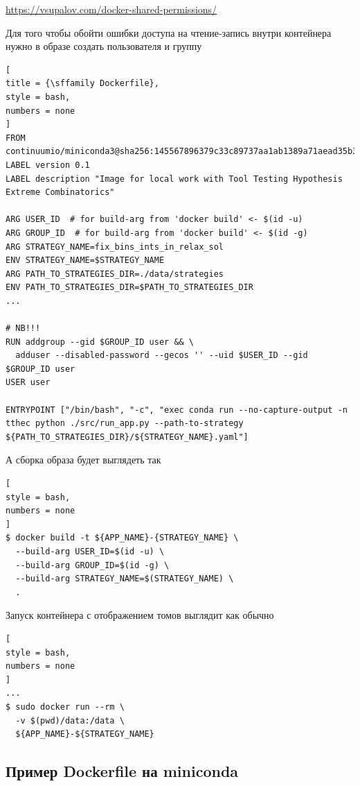\documentclass[%
	11pt,
	a4paper,
	utf8,
		]{article}
\begin{document}
\url{https://vsupalov.com/docker-shared-permissions/}

Для того чтобы обойти ошибки доступа на чтение-запись внутри контейнера нужно в образе создать пользователя и группу
\begin{lstlisting}[
title = {\sffamily Dockerfile},
style = bash,
numbers = none
]
FROM continuumio/miniconda3@sha256:145567896379c33c89737aa1ab1389a71aead35b39f512118a13edcf9fe2a42c
LABEL version 0.1
LABEL description "Image for local work with Tool Testing Hypothesis Extreme Combinatorics"

ARG USER_ID  # for build-arg from 'docker build' <- $(id -u)
ARG GROUP_ID  # for build-arg from 'docker build' <- $(id -g)
ARG STRATEGY_NAME=fix_bins_ints_in_relax_sol
ENV STRATEGY_NAME=$STRATEGY_NAME
ARG PATH_TO_STRATEGIES_DIR=./data/strategies
ENV PATH_TO_STRATEGIES_DIR=$PATH_TO_STRATEGIES_DIR
...

# NB!!!
RUN addgroup --gid $GROUP_ID user && \
  adduser --disabled-password --gecos '' --uid $USER_ID --gid $GROUP_ID user
USER user

ENTRYPOINT ["/bin/bash", "-c", "exec conda run --no-capture-output -n tthec python ./src/run_app.py --path-to-strategy ${PATH_TO_STRATEGIES_DIR}/${STRATEGY_NAME}.yaml"]
\end{lstlisting}

А сборка образа будет выглядеть так
\begin{lstlisting}[
style = bash,
numbers = none	
]
$ docker build -t ${APP_NAME}-{STRATEGY_NAME} \
  --build-arg USER_ID=$(id -u) \
  --build-arg GROUP_ID=$(id -g) \
  --build-arg STRATEGY_NAME=$(STRATEGY_NAME) \
  .
\end{lstlisting}

Запуск контейнера с отображением томов выглядит как обычно
\begin{lstlisting}[
style = bash,
numbers = none
]
...
$ sudo docker run --rm \
  -v $(pwd)/data:/data \
  ${APP_NAME}-${STRATEGY_NAME}
\end{lstlisting}

\subsection{Пример Dockerfile на miniconda}
\end{document}
